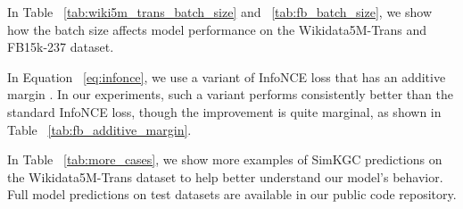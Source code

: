 \documentclass[11pt]{article}
\begin{document}
In Table ~\ref{tab:wiki5m_trans_batch_size} and ~\ref{tab:fb_batch_size},
we show how the batch size affects model performance
on the Wikidata5M-Trans and FB15k-237 dataset.

In Equation ~\ref{eq:infonce},
we use a variant of InfoNCE loss that has an additive margin .
In our experiments,
such a variant performs consistently better than the standard InfoNCE loss,
though the improvement is quite marginal,
as shown in Table ~\ref{tab:fb_additive_margin}.

In Table ~\ref{tab:more_cases},
we show more examples of SimKGC predictions on the Wikidata5M-Trans dataset
to help better understand our model's behavior.
Full model predictions on test datasets are available in our public code repository.
\end{document}
